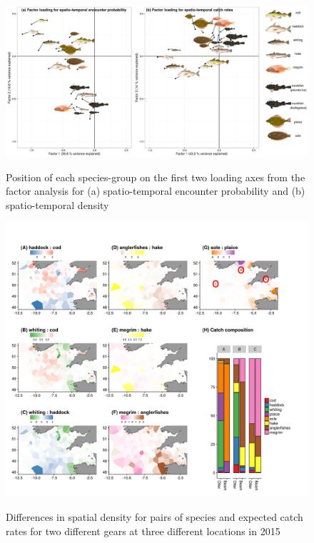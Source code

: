 \documentclass{article}
\begin{document}
\begin{figure}
\begin{center}
	\includegraphics[width=\linewidth]{"Figure 3 - PCAstyle_Plots_SpatioTemp"}
	\label{fig:3}
	\caption{Position of each species-group on the first two loading axes from the
	factor analysis for (a) spatio-temporal encounter probability and (b)
	spatio-temporal density}
\end{center}
\end{figure}


\begin{figure}
\begin{center}
	\includegraphics[width = \linewidth]{"Figure 4 - DensityDifferencesFigureswithCC"}
	\label{fig:4}
	\caption{Differences in spatial density for pairs of species and
		expected catch rates for two different gears at three different
	locations in 2015}
\end{center}
\end{figure}
\end{document}
